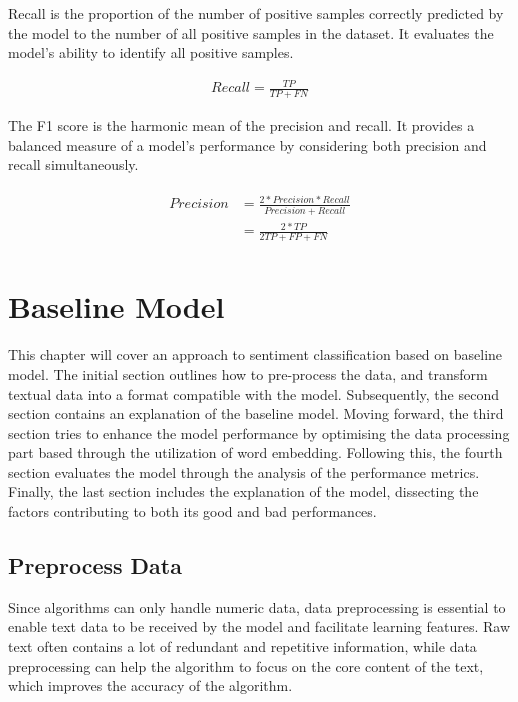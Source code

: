 \documentclass[ %
                    author={Bocheng Wang},
                supervisor={Dr. Qiang Liu},
                    degree={MSc},
                     title={A Research on Identification of Suicide Ideation in Texts with Multiple Models},
                      type={},
                      year={2024}]{dissertation}
\begin{document}
Recall is the proportion of the number of positive samples correctly predicted by the model to the number of all positive samples in the dataset. It evaluates the model's ability to identify all positive samples.

\begin{eqnarray}
      Recall = \frac{TP}{TP + FN}
      \label{rec}
\end{eqnarray}

The F1 score is the harmonic mean of the precision and recall. It provides a balanced measure of a model's performance by considering both precision and recall simultaneously.

\begin{eqnarray}
      \begin{aligned}
            Precision &= \frac{2\ast Precision \ast Recall}{Precision + Recall} \\
                      &= \frac{2\ast TP}{2 TP + FP + FN}
      \end{aligned}
      \label{f1s}
\end{eqnarray}



\chapter{Baseline Model}
\label{chap:execution1}
\noindent
This chapter will cover an approach to sentiment classification based on baseline model. The initial section outlines how to pre-process the data, and transform textual data into a format compatible with the model. Subsequently, the second section contains an explanation of the baseline model. Moving forward, the third section tries to enhance the model performance by optimising the data processing part based through the utilization of word embedding. Following this, the fourth section evaluates the model through the analysis of the performance metrics. Finally, the last section includes the explanation of the model, dissecting the factors contributing to both its good and bad performances.

\section{Preprocess Data}
\noindent
Since algorithms can only handle numeric data, data preprocessing is essential to enable text data to be received by the model and facilitate learning features. Raw text often contains a lot of redundant and repetitive information, while data preprocessing can help the algorithm to focus on the core content of the text, which improves the accuracy of the algorithm.
\end{document}
